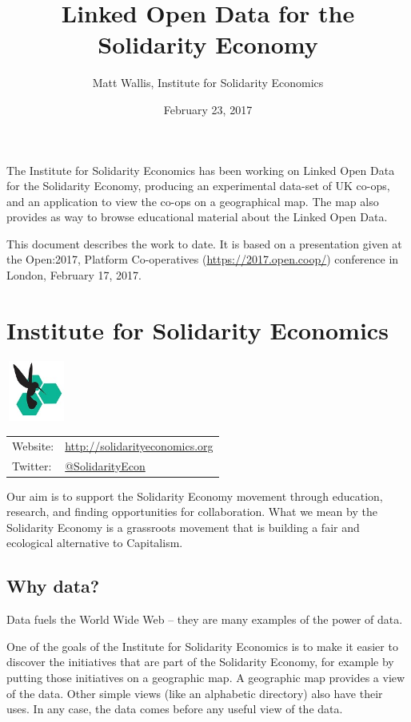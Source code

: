 \documentclass[11pt,twoside,a4paper]{article}
\title{Linked Open Data for the Solidarity Economy}
\author{Matt Wallis, Institute for Solidarity Economics}
\date{February 23, 2017}
\begin{document}
\maketitle

The Institute for Solidarity Economics has been working on Linked Open Data for the Solidarity Economy,
producing an experimental data-set of UK co-ops, and an application to view the co-ops on a geographical map.
The map also provides as way to browse educational material about the Linked Open Data.

This document describes the work to date.
It is based on a presentation given at the Open:2017,
Platform Co-operatives (\url{https://2017.open.coop/}) conference in London, February 17, 2017.

\section*{Institute for Solidarity Economics}
  \begin{center}
    \includegraphics[height=2cm,width=2cm]{ise-logo.jpg}

    \begin{tabular}{l l}
      Website: & \url{http://solidarityeconomics.org} \\
      Twitter: & \href{https://twitter.com/SolidarityEcon}{@SolidarityEcon} \\
    \end{tabular}
  \end{center}

Our aim is to support the Solidarity Economy movement through education, research, and finding opportunities for collaboration.
What we mean by the Solidarity Economy is a grassroots movement that is building a fair and ecological alternative to Capitalism.


\subsection*{Why data?}

Data fuels the World Wide Web -- they are many examples of the power of data. 

One of the goals of the Institute for Solidarity Economics is to make it easier to discover the initiatives that are part of the Solidarity Economy,
for example by putting those initiatives on a geographic map.
A geographic map provides a view of the data. Other simple views (like an alphabetic directory) also have their uses.
In any case, the data comes before any useful view of the data.
\end{document}
